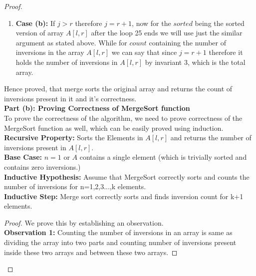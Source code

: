 \documentclass{article}
\begin{document}
{\begin {proof}
\begin{enumerate}[i]
            So, after completing the while loop on line 29 we would have inserted an additional $r+1-j$ elements and adding $k-l$ to this will lead to adding $r+1-l$ elements into $sorted$ array and it is sorted as discussed above. Also, since we are adding no more inversions after that point we can similarly say that we have counted all of the inversions present in $A[l, r]$ before entering loop at line 29. Now, we are putting these sorted elements in original array $A[l, r]$ in loop in line 33.
            \item {\textbf{Case (b):}} If $j > r$ therefore $j = r+1$, now for the $sorted$ being the sorted version of array $A[l, r]$ after the loop 25 ends we will use just the similar argument as stated above. While for $count$ containing the number of inversions in the array $A[l, r]$ we can say that since $j = r+1$ therefore it holds the number of inversions in $A[l, r]$ by invariant $3$, which is the total array. 
        \end{enumerate}
        Hence proved, that merge sorts the original array and returns the count of inversions present in it and it's correctness.\newline \\
        \textbf{Part (b): Proving Correctness of MergeSort function} \newline \\
        To prove the correctness of the algorithm, we need to prove correctness of the MergeSort function as well, which can be easily proved using induction.\\
        \textbf{Recursive Property: }Sorts the Elements in $A[l,r]$ and returns the number of inversions present in $A[l, r]$.\\
        \textbf{Base Case: } $n = 1$ or $A$ contains a single element (which is trivially sorted and contains zero inversions.)\\
        \textbf{Inductive Hypothesis: }Assume that MergeSort correctly sorts and counts the number of inversions for n=1,2,3...,k elements.\\
        \textbf{Inductive Step: }Merge sort correctly sorts and finds inversion count for k+1 elements.
        \begin{proof}
        We prove this by establishing an observation. \\
        \textbf{Observation 1:} Counting the number of inversions in an array is same as dividing the array into two parts and counting number of inversions present inside these two arrays and between these two arrays.

\end{proof}
\end{proof}}
\end{document}
